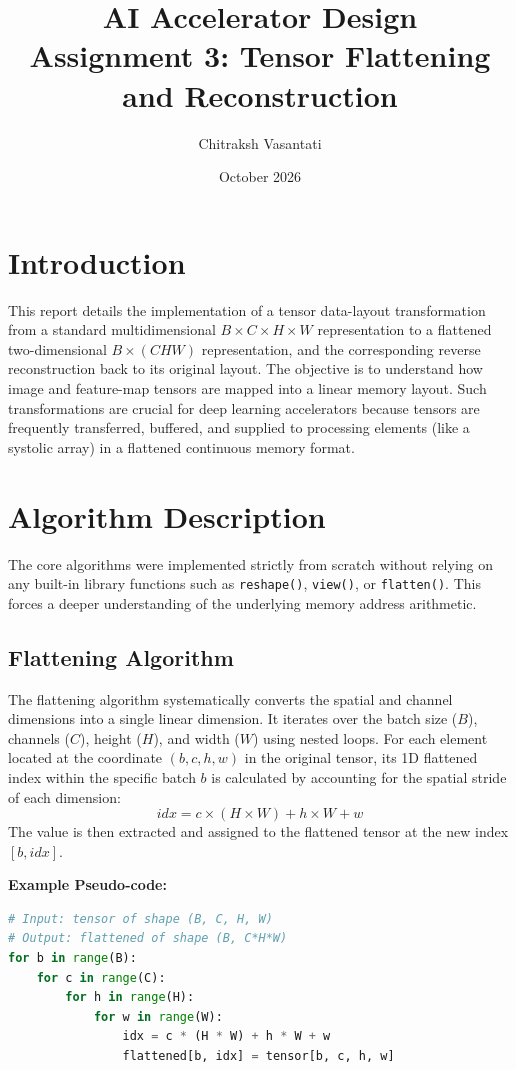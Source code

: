 \documentclass[12pt]{article}
\title{AI Accelerator Design\\Assignment 3: Tensor Flattening and Reconstruction}
\author{Chitraksh Vasantati}
\date{October 2026}
\begin{document}
\maketitle

\section{Introduction}
This report details the implementation of a tensor data-layout transformation from a standard multidimensional $B \times C \times H \times W$ representation to a flattened two-dimensional $B \times (CHW)$ representation, and the corresponding reverse reconstruction back to its original layout. The objective is to understand how image and feature-map tensors are mapped into a linear memory layout. Such transformations are crucial for deep learning accelerators because tensors are frequently transferred, buffered, and supplied to processing elements (like a systolic array) in a flattened continuous memory format.

\section{Algorithm Description}

The core algorithms were implemented strictly from scratch without relying on any built-in library functions such as \texttt{reshape()}, \texttt{view()}, or \texttt{flatten()}. This forces a deeper understanding of the underlying memory address arithmetic.

\subsection{Flattening Algorithm}
The flattening algorithm systematically converts the spatial and channel dimensions into a single linear dimension. It iterates over the batch size ($B$), channels ($C$), height ($H$), and width ($W$) using nested loops. For each element located at the coordinate $(b, c, h, w)$ in the original tensor, its 1D flattened index within the specific batch $b$ is calculated by accounting for the spatial stride of each dimension:
\[
    idx = c \times (H \times W) + h \times W + w
\]
The value is then extracted and assigned to the flattened tensor at the new index $[b, idx]$.

\textbf{Example Pseudo-code:}
\begin{lstlisting}[language=Python]
# Input: tensor of shape (B, C, H, W)
# Output: flattened of shape (B, C*H*W)
for b in range(B):
    for c in range(C):
        for h in range(H):
            for w in range(W):
                idx = c * (H * W) + h * W + w
                flattened[b, idx] = tensor[b, c, h, w]
\end{lstlisting}
\end{document}
